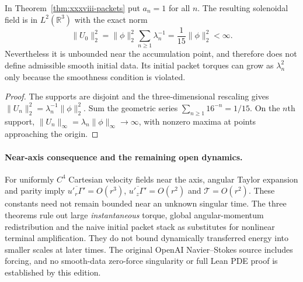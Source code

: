 \begin{proposition}
\label{prop:xxxviii-finite-energy}
In Theorem~\ref{thm:xxxviii-packets} put $a_n=1$ for all $n$.
The resulting solenoidal field is in $L^2(\mathbb R^3)$
with the exact norm
\begin{equation}\label{eq:xxxviii-energy}
\boxed{\quad\|U_0\|_2^2=
\|\phi\|_2^2\sum_{n\ge1}\lambda_n^{-1}
=\frac1{15}\|\phi\|_2^2<\infty.\quad}
\end{equation}
Nevertheless it is unbounded near the accumulation point,
and therefore does not define admissible smooth initial data.
Its initial packet torques can grow as $\lambda_n^2$
only because the smoothness condition is violated.
\end{proposition}
\begin{proof}
The supports are disjoint and the three-dimensional
rescaling gives
$\|U_n\|_2^2=\lambda_n^{-1}\|\phi\|_2^2$.
Sum the geometric series $\sum_{n\ge1}16^{-n}=1/15$.
On the $n$th support,
$\|U_n\|_\infty=\lambda_n\|\phi\|_\infty\to\infty$,
with nonzero maxima at points approaching the origin.
\end{proof}

\paragraph{Near-axis consequence and the remaining open dynamics.}
For uniformly $C^4$ Cartesian velocity fields near the axis,
angular Taylor expansion and parity imply
$\overline{u'_r\Gamma'}=O(r^3)$,
$\overline{u'_z\Gamma'}=O(r^2)$
and $\mathcal T=O(r^2)$.
These constants need not remain bounded near an
unknown singular time. The three theorems rule out
large \emph{instantaneous} torque, global angular-momentum
redistribution and the naive initial packet stack
as substitutes for nonlinear terminal amplification.
They do not bound dynamically transferred energy into
smaller scales at later times. The original OpenAI
Navier--Stokes source includes forcing, and no smooth-data
zero-force singularity or full Lean PDE proof
is established by this edition.
